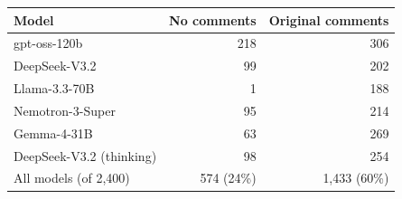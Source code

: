 \begin{tabular}{lrr}
\toprule
Model & No comments & Original comments \\
\midrule
gpt-oss-120b & 218 & 306 \\
DeepSeek-V3.2 & 99 & 202 \\
Llama-3.3-70B & 1 & 188 \\
Nemotron-3-Super & 95 & 214 \\
Gemma-4-31B & 63 & 269 \\
DeepSeek-V3.2 (thinking) & 98 & 254 \\
\midrule
All models (of 2,400) & 574 (24\%) & 1,433 (60\%) \\
\bottomrule
\end{tabular}
